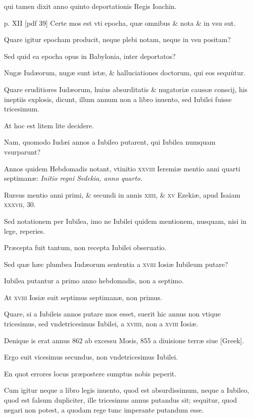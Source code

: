 \begin{parnumbers}
qui tamen dixit anno quinto deportationis Regis Ioachin.

\clearpage
p. XII [pdf 39]
Certe mos est vti epocha, quæ omnibus \& nota \& in vsu sut.

Quare
igitur epocham producit, neque plebi notam, neque in vsu positam?

Sed quid ea epocha opus in Babylonia, inter deportatos?

Nugæ Iudæorum,
nugæ sunt istæ, \& halluciationes doctorum, qui eos sequūtur.

Quare eruditiores Iudæorum, huius absurditatis \& nugatoriæ
caussæ conscij, his ineptiis explosis, dicunt, illum annum non a
libro inuento, sed Iubilei fuisse tricesimum.

At hoc est litem lite decidere.

Nam, quomodo Iudæi annos a Iubileo putarent, qui Iubilea
numquam vsurparunt?

Annos quidem Hebdomadis notant, vtinitio
\textsc{xxviii} Ieremiæ mentio anni quarti septimanæ: \textit{Initio regni
Sedekia, anno quarto.}

Rursus mentio anni primi, \& secundi in annis
\textsc{xiiii}, \& \textsc{xv} Ezekiæ, apud Isaiam \textsc{xxxvii}, 30.

Sed notationem
per Iubilea, imo ne Iubilei quidem mentionem, nusquam, nisi
in lege, reperies.

Præcepta fuit tantum, non recepta Iubilei obseruatio.

Sed quæ hæc plumbea Iudæorum sententia a \textsc{xviii} Iosiæ
Iubileum putare?

Iubilea putantur a primo anno hebdomadis, non
a septimo.

At \textsc{xviii} Iosiæ suit septimus septimanæ, non primus.

Quare, si a Iubileis annos putare mos esset, suerit hic annus non vtique
tricesimus, sed vndetricesimus Iubilei, a \textsc{xviiii}, non a
\textsc{xviii} Iosiæ.

Denique is erat annus 862 ab excessu Mosis, 855 a
diuisione terræ siue \textgreek{[Greek]}.

Ergo suit vicesimus secundus, non
vndetricesimus Iubilei.

En quot errores locus præpostere sumptus
nobis peperit.

Cum igitur neque a libro legis inuento, quod est absurdissimum,
neque a Iubileo, quod est falsum dupliciter, ille tricesimus
annus putandus sit; sequitur, quod negari non potest, a
quodam rege tunc imperante putandum esse.


\end{parnumbers}
